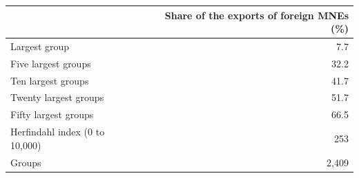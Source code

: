 \begin{tabular}{lr}
\toprule
 & Share of the exports of foreign MNEs (\%) \\
\midrule
Largest group & 7.7 \\
Five largest groups & 32.2 \\
Ten largest groups & 41.7 \\
Twenty largest groups & 51.7 \\
Fifty largest groups & 66.5 \\
\midrule
Herfindahl index (0 to 10,000) & 253 \\
Groups & 2,409 \\
\bottomrule
\end{tabular}
